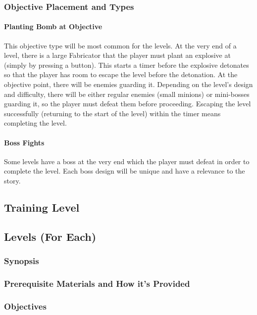 \documentclass[12pt]{article}
\begin{document}
\subsubsection{Objective Placement and Types}

\paragraph{Planting Bomb at Objective}

This objective type will be most common for the levels. At the very end of a level, there is a large Fabricator that the player must plant an explosive at (simply by pressing a button). This starts a timer before the explosive detonates so that the player has room to escape the level before the detonation. At the objective point, there will be enemies guarding it. Depending on the level's design and difficulty, there will be either regular enemies (small minions) or mini-bosses guarding it, so the player must defeat them before proceeding. Escaping the level successfully (returning to the start of the level) within the timer means completing the level. 

\paragraph{Boss Fights}

Some levels have a boss at the very end which the player must defeat in order to complete the level. Each boss design will be unique and have a relevance to the story. 

\subsection{Training Level}

\subsection{Levels (For Each)}

\subsubsection{Synopsis}

\subsubsection{Prerequisite Materials and How it's Provided}

\subsubsection{Objectives}
\end{document}
